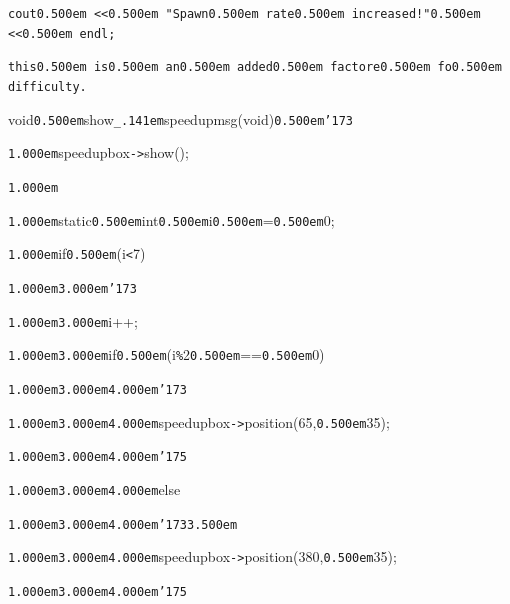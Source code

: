 \documentclass[12pt]{article}
\begin{document}
\noindent
\tt\mc {\tt\mc \kern1.000em}{\tt\mc \kern3.000em}\rm\mc {\tt /}{\tt /}cout\kern0.500em {\tt <}{\tt <}\kern0.500em {\tt "}Spawn\kern0.500em rate\kern0.500em increased!{\tt "}\kern0.500em {\tt <}{\tt <}\kern0.500em endl;

\noindent
\tt{}\tt\mc {\tt /}{\tt /}this\kern0.500em is\kern0.500em an\kern0.500em added\kern0.500em factore\kern0.500em fo\kern0.500em difficulty.

\noindent
\tt{}

\noindent
{}\hfill

\noindent
{}void{\tt\mc \kern0.500em}show{\tt\_\kern.141em}speedupmsg(void{\tt *}){\tt\mc \kern0.500em}{\tt\char'173}

\noindent
{}{\tt\mc \kern1.000em}speedupbox{\tt -}{\tt >}show();

\noindent
{}{\tt\mc \kern1.000em}

\noindent
{}{\tt\mc \kern1.000em}static{\tt\mc \kern0.500em}int{\tt\mc \kern0.500em}i{\tt\mc \kern0.500em}={\tt\mc \kern0.500em}0;

\noindent
{}{\tt\mc \kern1.000em}if{\tt\mc \kern0.500em}(i{\tt <}7)

\noindent
{}{\tt\mc \kern1.000em}{\tt\mc \kern3.000em}{\tt\char'173}

\noindent
{}{\tt\mc \kern1.000em}{\tt\mc \kern3.000em}i++;

\noindent
{}{\tt\mc \kern1.000em}{\tt\mc \kern3.000em}if{\tt\mc \kern0.500em}(i{\tt\%}2{\tt\mc \kern0.500em}=={\tt\mc \kern0.500em}0)

\noindent
{}{\tt\mc \kern1.000em}{\tt\mc \kern3.000em}{\tt\mc \kern4.000em}{\tt\char'173}

\noindent
{}{\tt\mc \kern1.000em}{\tt\mc \kern3.000em}{\tt\mc \kern4.000em}speedupbox{\tt -}{\tt >}position(65,{\tt\mc \kern0.500em}35);

\noindent
{}{\tt\mc \kern1.000em}{\tt\mc \kern3.000em}{\tt\mc \kern4.000em}{\tt\char'175}

\noindent
{}{\tt\mc \kern1.000em}{\tt\mc \kern3.000em}{\tt\mc \kern4.000em}else

\noindent
{}{\tt\mc \kern1.000em}{\tt\mc \kern3.000em}{\tt\mc \kern4.000em}{\tt\char'173}{\tt\mc \kern3.500em}

\noindent
{}{\tt\mc \kern1.000em}{\tt\mc \kern3.000em}{\tt\mc \kern4.000em}speedupbox{\tt -}{\tt >}position(380,{\tt\mc \kern0.500em}35);

\noindent
{}{\tt\mc \kern1.000em}{\tt\mc \kern3.000em}{\tt\mc \kern4.000em}{\tt\char'175}
\end{document}
